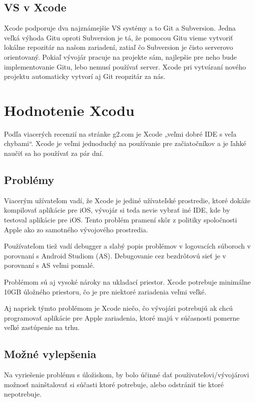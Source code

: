 \documentclass[12pt]{article}
\begin{document}
		\subsection{VS v Xcode}
			Xcode podporuje dva najznámejšie VS systémy a to Git a Subversion.  Jedna veľká výhoda Gitu oproti Subversion je tá,  že pomocou Gitu vieme vytvoriť lokálne repozitár na našom zariadení,  zatiaľ čo Subversion je čisto serverovo orientovaný.  Pokiaľ vývojár pracuje na projekte sám,  najlepšie pre neho bude implementovanie Gitu,  lebo nemusí používať server.  Xcode pri vytváraní nového projektu automaticky vytvorí aj Git reopzitár za nás.  \cite{xcodevcs} \par

	\newpage
		\section{Hodnotenie Xcodu}
			Podľa viacerých recenzií na stránke g2.com \cite{g2xreviews} je Xcode „veľmi dobré IDE s veľa chybami“.  Xcode je veľmi jednoduchý na používanie pre začiatočníkov a je ľahké naučiť sa ho používať za pár dní.

		\subsection{Problémy}
			Viacerým užívateľom vadí,  že Xcode je jediné užívateľské prostredie,  ktoré dokáže kompilovať aplikácie pre iOS,  vývojár si teda nevie vybrať iné IDE,  kde by testoval aplikácie pre iOS.  Tento problém pramení skôr z politiky spoločnosti Apple ako zo samotného vývojového prostredia.  \par
			Používateľom tiež vadí debugger a slabý popis problémov v logovacích súboroch v porovnaní s Android Studiom (AS).  Debugovanie cez bezdrôtovú sieť je v porovnaní s AS veľmi pomalé.  \par
			Problémom sú aj vysoké nároky na ukladací priestor.  Xcode potrebuje minimálne 10GB úložného priestoru,  čo je pre niektoré zariadenia veľmi veľké.  \par
			Aj napriek týmto problémom je Xcode niečo,  čo vývojári potrebujú ak chcú programovať aplikácie pre Apple zariadenia,  ktoré majú v súčasnosti pomerne veľké zastúpenie na trhu.

		\subsection{Možné vylepšenia}
			Na vyriešenie problému s úložiskom,  by bolo účinné dať použivateľovi/vývojárovi možnosť nainštalovať si súčasti ktoré potrebuje,  alebo odstrániť tie ktoré nepotrebuje.
\end{document}
